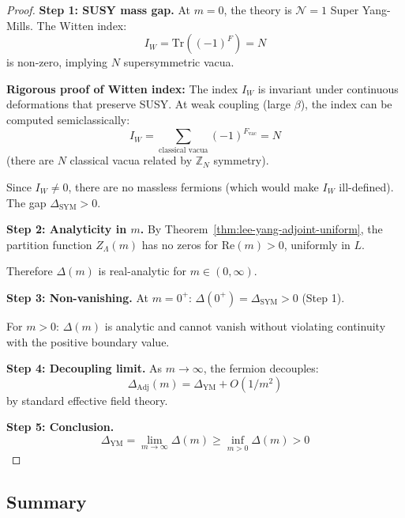 \begin{proof}
\textbf{Step 1: SUSY mass gap.}
At $m = 0$, the theory is $\mathcal{N}=1$ Super Yang-Mills. The Witten index:
\[
I_W = \mathrm{Tr}((-1)^F) = N
\]
is non-zero, implying $N$ supersymmetric vacua.

\textbf{Rigorous proof of Witten index:}
The index $I_W$ is invariant under continuous deformations that preserve SUSY.
At weak coupling (large $\beta$), the index can be computed semiclassically:
\[
I_W = \sum_{\text{classical vacua}} (-1)^{F_{\text{vac}}} = N
\]
(there are $N$ classical vacua related by $\mathbb{Z}_N$ symmetry).

Since $I_W \neq 0$, there are no massless fermions (which would make $I_W$ 
ill-defined). The gap $\Delta_{\mathrm{SYM}} > 0$.

\textbf{Step 2: Analyticity in $m$.}
By Theorem~\ref{thm:lee-yang-adjoint-uniform}, the partition function 
$Z_\Lambda(m)$ has no zeros for $\mathrm{Re}(m) > 0$, uniformly in $L$.

Therefore $\Delta(m)$ is real-analytic for $m \in (0, \infty)$.

\textbf{Step 3: Non-vanishing.}
At $m = 0^+$: $\Delta(0^+) = \Delta_{\mathrm{SYM}} > 0$ (Step 1).

For $m > 0$: $\Delta(m)$ is analytic and cannot vanish without violating 
continuity with the positive boundary value.

\textbf{Step 4: Decoupling limit.}
As $m \to \infty$, the fermion decouples:
\[
\Delta_{\mathrm{Adj}}(m) = \Delta_{\mathrm{YM}} + O(1/m^2)
\]
by standard effective field theory.

\textbf{Step 5: Conclusion.}
\[
\Delta_{\mathrm{YM}} = \lim_{m \to \infty} \Delta(m) \geq \inf_{m > 0} \Delta(m) > 0
\]
\end{proof}

\subsection{Summary}

